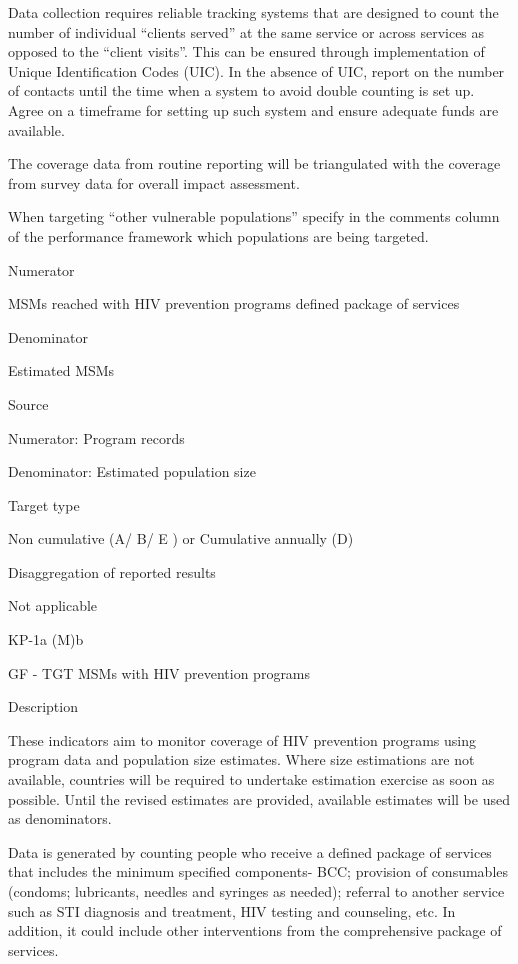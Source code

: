 \documentclass[]{book}
\begin{document}
Data collection requires reliable tracking systems that are designed to count the number of individual ``clients served'' at the same service or across services as opposed to the ``client visits''. This can be ensured through implementation of Unique Identification Codes (UIC). In the absence of UIC, report on the number of contacts until the time when a system to avoid double counting is set up. Agree on a timeframe for setting up such system and ensure adequate funds are available.

The coverage data from routine reporting will be triangulated with the coverage from survey data for overall impact assessment.

When targeting ``other vulnerable populations'' specify in the comments column of the performance framework which populations are being targeted.

Numerator

MSMs reached with HIV prevention programs defined package of services

Denominator

Estimated MSMs

Source

Numerator: Program records

Denominator: Estimated population size

Target type

Non cumulative (A/ B/ E ) or Cumulative annually (D)

Disaggregation of reported results

Not applicable

KP-1a (M)b

GF - TGT MSMs with HIV prevention programs

Description

These indicators aim to monitor coverage of HIV prevention programs using program data and population size estimates. Where size estimations are not available, countries will be required to undertake estimation exercise as soon as possible. Until the revised estimates are provided, available estimates will be used as denominators.

Data is generated by counting people who receive a defined package of services that includes the minimum specified components- BCC; provision of consumables (condoms; lubricants, needles and syringes as needed); referral to another service such as STI diagnosis and treatment, HIV testing and counseling, etc. In addition, it could include other interventions from the comprehensive package of services.
\end{document}
